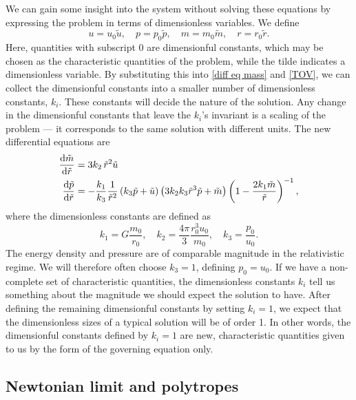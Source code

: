 We can gain some insight into the system without solving these equations by expressing the problem in terms of dimensionless variables.
We define
%
\begin{equation}
    u = u_0 \tilde u, \quad 
    p = p_0 \tilde p, \quad 
    m = m_0 \tilde m, \quad 
    r = r_0 \tilde r.
\end{equation}
%
Here, quantities with subscript $0$ are dimensionful constants, which may be chosen as the characteristic quantities of the problem, while the tilde indicates a dimensionless variable.
By substituting this into \autoref{diff eq mass} and \autoref{TOV}, we can collect the dimensionful constants into a smaller number of dimensionless constants, $k_i$.
These constants will decide the nature of the solution.
Any change in the dimensionful constants that leave the $k_i$'s invariant is a scaling of the problem --- it corresponds to the same solution with different units.
The new differential equations are
%
\begin{align}
    \label{mass relation dimensionless}
    \odv{ \tilde m}{\tilde r} & = 3 k_2\, \tilde r^2 \tilde u \\
    \label{TOV dimensionless}
    \odv{\tilde p}{\tilde r} & 
    = - \frac{k_1}{k_3} \frac{1}{\tilde r^2} \left(k_3\tilde p + \tilde u\right) 
    \left(3 k_2 k_3  \tilde r^3 \tilde p + \tilde m\right) 
    \left(1 - \frac{2 k_1  \tilde m}{\tilde r}\right)^{-1},
\end{align}
%
where the dimensionless constants are defined as
%
\begin{equation}
    \label{dimensionless constants TOV}
    k_1 = G \frac{m_0}{r_0}, \quad 
    k_2 =  \frac{4 \pi}{3} \frac{r_0^3 u_0}{m_0}, \quad
    k_3 = \frac{p_0}{u_0}.
\end{equation}
%
The energy density and pressure are of comparable magnitude in the relativistic regime.
We will therefore often choose $k_3 = 1$, defining $p_0 = u_0$.
If we have a non-complete set of characteristic quantities, the dimensionless constants $k_i$ tell us something about the magnitude we should expect the solution to have.
After defining the remaining dimensionful constants by setting $k_i = 1$, we expect that the dimensionless sizes of a typical solution will be of order 1.
In other words, the dimensionful constants defined by $k_i = 1$ are new, characteristic quantities given to us by the form of the governing equation only.





\subsection{Newtonian limit and polytropes}
\label{subsection: Newtonian limit and polytropes}

